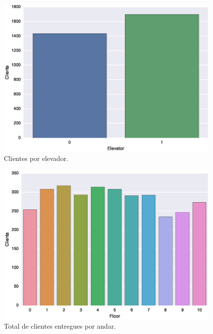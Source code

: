 \begin{figure}[htb!]
  \centering
  \includegraphics[scale=0.6]{img/results/Low-rise/5_Planning_Random/clientsPerElevator.eps}
  \caption{Clientes por elevador.}
  \label{fig:graphs:clientsperelevator}
\end{figure}

\begin{figure}[htb!]
  \centering
  \includegraphics[scale=0.6]{img/results/Low-rise/5_Planning_Random/dropoffsPerFloor.eps}
  \caption{Total de clientes entregues por andar.}
  \label{fig:graphs:dropoffsPerFloor}
\end{figure}

